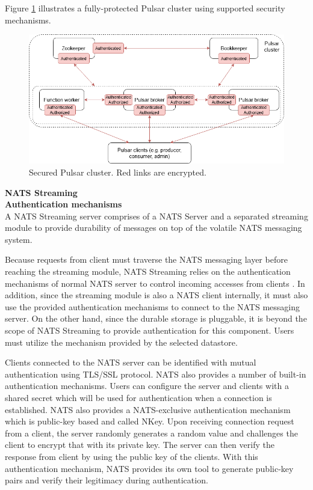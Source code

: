 Figure \ref{fig:securitypulsar} illustrates a fully-protected Pulsar cluster using supported security mechanisms.

\begin{figure}[h]
	\centering
	\includegraphics[width=\linewidth]{images/security-pulsar.png}
	\caption{Secured Pulsar cluster. Red links are encrypted.}
	\label{fig:securitypulsar}
\end{figure} 

\large \textbf{NATS Streaming}\\
\normalsize
\textbf{Authentication mechanisms}\\
A NATS Streaming server comprises of a NATS Server and a separated streaming module to provide durability of messages on top of the volatile NATS messaging system. 

Because requests from client must traverse the NATS messaging layer before reaching the streaming module, NATS Streaming relies on the authentication mechanisms of normal NATS server to control incoming accesses from clients \cite{normalnatsconfig}. In addition, since the streaming module is also a NATS client internally, it must also use the provided authentication mechanisms to connect to the NATS messaging server. On the other hand, since the durable storage is pluggable, it is beyond the scope of NATS Streaming to provide authentication for this component. Users must utilize the mechanism provided by the selected datastore.

Clients connected to the NATS server can be identified with mutual authentication using TLS/SSL protocol. NATS also provides a number of built-in authentication mechanisms. Users can configure the server and clients with a shared secret which will be used for authentication when a connection is established. NATS also provides a NATS-exclusive authentication mechanism which is public-key based and called NKey. Upon receiving connection request from a client, the server randomly generates a random value and challenges the client to encrypt that with its private key. The server can then verify the response from client by using the public key of the clients. With this authentication mechanism, NATS provides its own tool to generate public-key pairs and verify their legitimacy during authentication.

